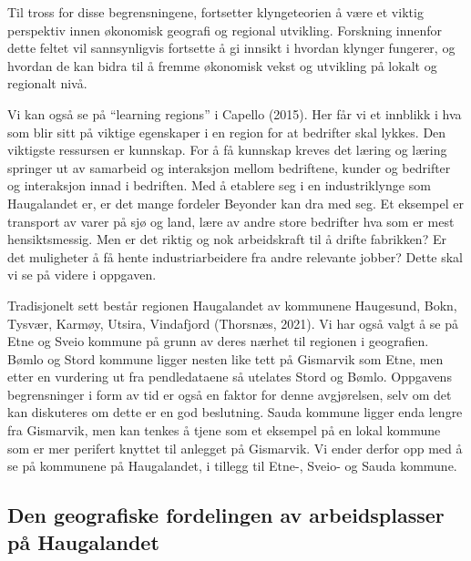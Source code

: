 \documentclass[
]{article}
\begin{document}
Til tross for disse begrensningene, fortsetter klyngeteorien å være et
viktig perspektiv innen økonomisk geografi og regional utvikling.
Forskning innenfor dette feltet vil sannsynligvis fortsette å gi innsikt
i hvordan klynger fungerer, og hvordan de kan bidra til å fremme
økonomisk vekst og utvikling på lokalt og regionalt nivå.

Vi kan også se på ``learning regions'' i Capello (2015). Her får vi et
innblikk i hva som blir sitt på viktige egenskaper i en region for at
bedrifter skal lykkes. Den viktigste ressursen er kunnskap. For å få
kunnskap kreves det læring og læring springer ut av samarbeid og
interaksjon mellom bedriftene, kunder og bedrifter og interaksjon innad
i bedriften. Med å etablere seg i en industriklynge som Haugalandet er,
er det mange fordeler Beyonder kan dra med seg. Et eksempel er transport
av varer på sjø og land, lære av andre store bedrifter hva som er mest
hensiktsmessig. Men er det riktig og nok arbeidskraft til å drifte
fabrikken? Er det muligheter å få hente industriarbeidere fra andre
relevante jobber? Dette skal vi se på videre i oppgaven.

Tradisjonelt sett består regionen Haugalandet av kommunene Haugesund,
Bokn, Tysvær, Karmøy, Utsira, Vindafjord (Thorsnæs, 2021). Vi har også
valgt å se på Etne og Sveio kommune på grunn av deres nærhet til
regionen i geografien. Bømlo og Stord kommune ligger nesten like tett på
Gismarvik som Etne, men etter en vurdering ut fra pendledataene så
utelates Stord og Bømlo. Oppgavens begrensninger i form av tid er også
en faktor for denne avgjørelsen, selv om det kan diskuteres om dette er
en god beslutning. Sauda kommune ligger enda lengre fra Gismarvik, men
kan tenkes å tjene som et eksempel på en lokal kommune som er mer
perifert knyttet til anlegget på Gismarvik. Vi ender derfor opp med å se
på kommunene på Haugalandet, i tillegg til Etne-, Sveio- og Sauda
kommune.

\hypertarget{den-geografiske-fordelingen-av-arbeidsplasser-puxe5-haugalandet}{%
\subsection{Den geografiske fordelingen av arbeidsplasser på
Haugalandet}\label{den-geografiske-fordelingen-av-arbeidsplasser-puxe5-haugalandet}}
\end{document}

